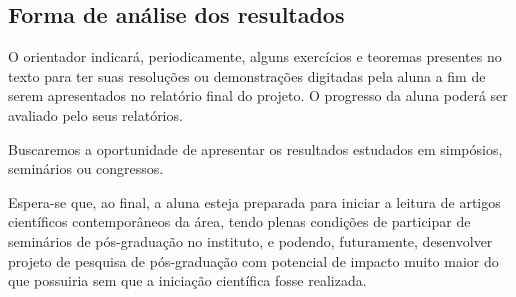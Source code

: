 \documentclass{article}
\begin{document}
    \subsection{Forma de análise dos resultados}
    O orientador indicará, periodicamente, alguns exercícios e teoremas presentes no texto para ter suas resoluções ou demonstrações digitadas pela aluna a fim de serem apresentados no relatório final do projeto. O progresso da aluna poderá ser avaliado pelo seus relatórios.
    
    Buscaremos a oportunidade de apresentar os resultados estudados em simpósios, seminários ou congressos.

    Espera-se que, ao final, a aluna esteja preparada para iniciar a leitura de artigos científicos contemporâneos da área, tendo plenas condições de participar de seminários de pós-graduação no instituto, e podendo, futuramente, desenvolver projeto de pesquisa de pós-graduação com potencial de impacto muito maior do que possuiria sem que a iniciação científica fosse realizada.


\end{document}
